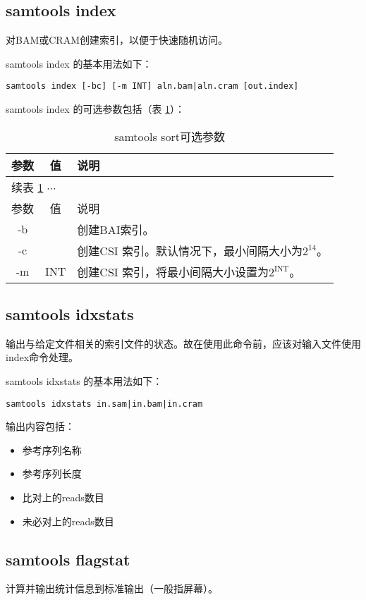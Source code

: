 \subsection{samtools index}
对BAM或CRAM创建索引，以便于快速随机访问。

samtools index 的基本用法如下：
\begin{lstlisting}[style=mycommandBlockStyle]
samtools index [-bc] [-m INT] aln.bam|aln.cram [out.index] 
\end{lstlisting}

samtools  index 的可选参数包括（表 \ref{table:samtools_index_options}）：

\begin{longtable}{|c|c|p{}|}
	\caption{samtools sort可选参数} \label{table:samtools_index_options}\\
	\hline
	参数 & 值 & 说明\\
	\endfirsthead
	\hline
	\multicolumn{3}{|l|}{续表 \ref{table:samtools_index_options} $ \cdots $} \\
	\hline
	参数 & 值 & 说明\\
	\endhead
	\hline 
	-b & & 创建BAI索引。 \\ \hline
	-c & & 创建CSI 索引。默认情况下，最小间隔大小为$ 2^{14} $。\\ \hline
	-m & INT & 创建CSI 索引，将最小间隔大小设置为$ 2^{\text{INT}} $。 \\ \hline
\end{longtable}

\subsection{samtools idxstats}

输出与给定文件相关的索引文件的状态。故在使用此命令前，应该对输入文件使用index命令处理。

samtools idxstats 的基本用法如下：
\begin{lstlisting}[style=mycommandBlockStyle]
samtools idxstats in.sam|in.bam|in.cram 
\end{lstlisting}

输出内容包括：
\begin{itemize}
	\item 参考序列名称
	\item 参考序列长度
	\item 比对上的reads数目
	\item 未必对上的reads数目
\end{itemize}

\subsection{samtools flagstat}
计算并输出统计信息到标准输出（一般指屏幕）。

